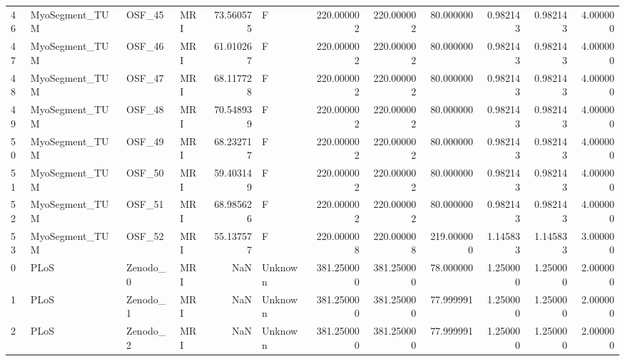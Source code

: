 \begin{tabular}{llllrlrrrrrr}
46     &  MyoSegment\_TUM &       OSF\_45 &                MRI &  73.560575 &        F &       220.000002 &    220.000002 &   80.000000 &               0.982143 &            0.982143 &          4.000000 \\
47     &  MyoSegment\_TUM &       OSF\_46 &                MRI &  61.010267 &        F &       220.000002 &    220.000002 &   80.000000 &               0.982143 &            0.982143 &          4.000000 \\
48     &  MyoSegment\_TUM &       OSF\_47 &                MRI &  68.117728 &        F &       220.000002 &    220.000002 &   80.000000 &               0.982143 &            0.982143 &          4.000000 \\
49     &  MyoSegment\_TUM &       OSF\_48 &                MRI &  70.548939 &        F &       220.000002 &    220.000002 &   80.000000 &               0.982143 &            0.982143 &          4.000000 \\
50     &  MyoSegment\_TUM &       OSF\_49 &                MRI &  68.232717 &        F &       220.000002 &    220.000002 &   80.000000 &               0.982143 &            0.982143 &          4.000000 \\
51     &  MyoSegment\_TUM &       OSF\_50 &                MRI &  59.403149 &        F &       220.000002 &    220.000002 &   80.000000 &               0.982143 &            0.982143 &          4.000000 \\
52     &  MyoSegment\_TUM &       OSF\_51 &                MRI &  68.985626 &        F &       220.000002 &    220.000002 &   80.000000 &               0.982143 &            0.982143 &          4.000000 \\
53     &  MyoSegment\_TUM &       OSF\_52 &                MRI &  55.137577 &        F &       220.000008 &    220.000008 &  219.000000 &               1.145833 &            1.145833 &          3.000000 \\
0      &            PLoS &     Zenodo\_0 &                MRI &        NaN &  Unknown &       381.250000 &    381.250000 &   78.000000 &               1.250000 &            1.250000 &          2.000000 \\
1      &            PLoS &     Zenodo\_1 &                MRI &        NaN &  Unknown &       381.250000 &    381.250000 &   77.999991 &               1.250000 &            1.250000 &          2.000000 \\
2      &            PLoS &     Zenodo\_2 &                MRI &        NaN &  Unknown &       381.250000 &    381.250000 &   77.999991 &               1.250000 &            1.250000 &          2.000000 \\

\end{tabular}

